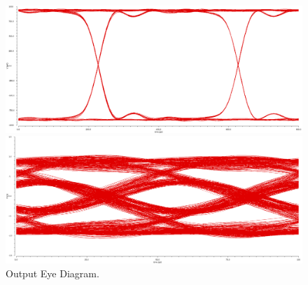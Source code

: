 \documentclass{book}  %
\begin{document}
\begin{paper}
\begin{figure}[htbp!]
	\centering	
	\begin{minipage}[tb]{0.5\textwidth}
		\centering	
		\includegraphics[height=0.15\textheight]{./img/channel_response_eye_diagram/output_differential_eye_3gbp.png}
	\end{minipage}%
	\begin{minipage}[tb]{0.5\textwidth}
		\centering	
		\includegraphics[height=0.15\textheight]{./img/channel_response_eye_diagram/output_differential_eye_20gbp.png}
	\end{minipage}
	\caption{Output Eye Diagram.}
\end{figure}


\end{paper}
\end{document}
